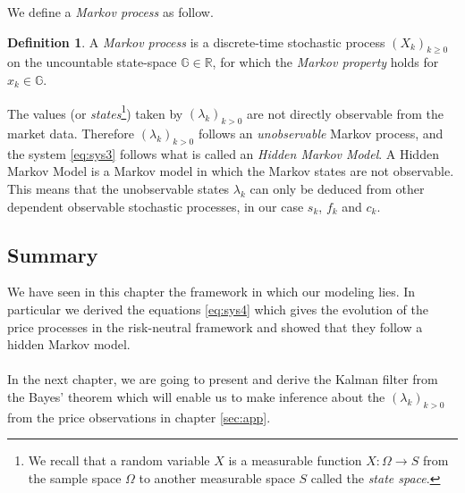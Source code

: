 \documentclass{article}
\theoremstyle{definition}
\newtheorem{definition}[thm]{Definition}
\theoremstyle{remark}
\newcommand{\measure}[1]{\ensuremath{\mathbb{#1}}}
\newcommand{\processD}[1]{\ensuremath{(#1_k)_{k>0}}}
\begin{document}
We define a \emph{Markov process} as follow.

\begin{definition}
A \emph{Markov process} is a discrete-time stochastic process $(X_k)_{k\geq 0}$ on the uncountable state-space $\measure{G}\in \measure{R}$, for which the \emph{Markov property} holds for $x_k \in \measure{G}$.
\end{definition}

The values (or \emph{states}\footnote{We recall that a random variable $X$ is a measurable function $X: \Omega \rightarrow S$ from the sample space $\Omega$ to another measurable space $S$ called the \emph{state space}.}) taken by \processD{\lambda} are not directly observable from the market data. Therefore \processD{\lambda} follows an \emph{unobservable} Markov process, and the system \eqref{eq:sys3} follows what is called an \emph{Hidden Markov Model}. A Hidden Markov Model is a Markov model in which the Markov states are not observable. This means that the unobservable states $\lambda_k$ can only be deduced from other dependent observable stochastic processes, in our case $s_{k}$, $f_{k}$ and $c_{k}$. \\












\subsection{Summary}

We have seen in this chapter the framework in which our modeling lies. In particular we derived the equations \eqref{eq:sys4} which gives the evolution of the price processes in the risk-neutral framework and showed that they follow a hidden Markov model.\\
\\
In the next chapter, we are going to present and derive the Kalman filter from the Bayes' theorem which will enable us to make inference about the \processD{\lambda} from the price observations in chapter \ref{sec:app}.
\end{document}
